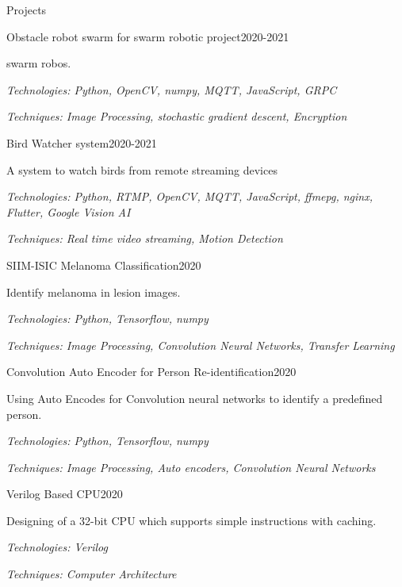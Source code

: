 \documentclass{resume} %
\begin{document}

\begin{rSection}{Projects}

\begin{rSubsection}{Obstacle robot swarm for swarm robotic project}{2020-2021}{}{}
\item swarm robos. \item 
\textit{Technologies: Python, OpenCV, numpy, MQTT, JavaScript, GRPC}
\item \textit{Techniques: Image Processing, stochastic gradient descent, Encryption }
\end{rSubsection}

\begin{rSubsection}{Bird Watcher system}{2020-2021}{}{}
\item A system to watch birds from remote streaming devices \item 
\textit{Technologies: Python, RTMP, OpenCV, MQTT, JavaScript, ffmepg, nginx, Flutter, Google Vision AI}
\item \textit{Techniques: Real time video streaming, Motion Detection}
\end{rSubsection}

\begin{rSubsection}{SIIM-ISIC Melanoma Classification}{2020}{}{}
\item Identify melanoma in lesion images. \item 
\textit{Technologies: Python, Tensorflow, numpy}
\item \textit{Techniques: Image Processing, Convolution Neural Networks, Transfer Learning }
\end{rSubsection}



\begin{rSubsection}{Convolution Auto Encoder for Person Re-identification}{2020}{}{}
\item Using Auto Encodes for Convolution neural networks to identify a predefined person. \item 
\textit{Technologies: Python, Tensorflow, numpy}
\item \textit{Techniques: Image Processing, Auto encoders, Convolution Neural Networks}
\end{rSubsection}


\begin{rSubsection}{Verilog Based CPU}{2020}{}{}
\item Designing of a 32-bit CPU which supports simple instructions with caching. \item 
\textit{Technologies: Verilog}
\item \textit{Techniques: Computer Architecture }
\end{rSubsection}



\end{rSection}
\end{document}
